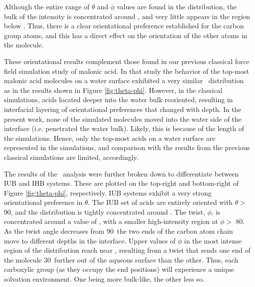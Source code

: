 Although the entire range of $\theta$ and $\phi$ values are found in the distribution, the bulk of the intensity is concentrated around \degr, and very little appears in the region below \degr. Thus, there is a clear orientational preference established for the carbon group atoms, and this has a direct effect on the orientation of the other atoms in the molecule.

These orientational results complement those found in our previous classical force field simulation study of malonic acid.\cite{Blower2012} In that study the behavior of the top-most malonic acid molecules on a water surface exhibited a very similar \thetaphi~distribution as in the results shown in Figure \ref{fig:theta-phi}. However, in the classical simulations, acids located deeper into the water bulk reoriented, resulting in interfacial layering of orientational preferences that changed with depth. In the present work, none of the simulated molecules moved into the water side of the interface (i.e. penetrated the water bulk). Likely, this is because of the length of the simulations. Hence, only the top-most acids on a water surface are represented in the simulations, and comparison with the results from the previous classical simulations are limited, accordingly.

The results of the \thetaphi~analysis were further broken down to differentiate between IUB and IHB systems. These are plotted on the top-right and bottom-right of Figure \ref{fig:theta-phi}, respectively. IUB systems exhibit a very strong orientational preference in $\theta$. The IUB set of acids are entirely oriented with $\theta >$ 90\degr, and the distribution is tightly concentrated around \degr. The twist, $\phi$, is concentrated around a value of \degr, with a smaller high-intensity region at $\phi >$ 80\degr. As the twist angle decreases from 90\degr~the two ends of the carbon atom chain move to different depths in the interface. Upper values of $\phi$ in the most intense region of the distribution reach near \degr, resulting from a twist that sends one end of the molecule 30\degr~further out of the aqueous surface than the other. Thus, each carboxylic group (as they occupy the end positions) will experience a unique solvation environment. One being more bulk-like, the other less so.

